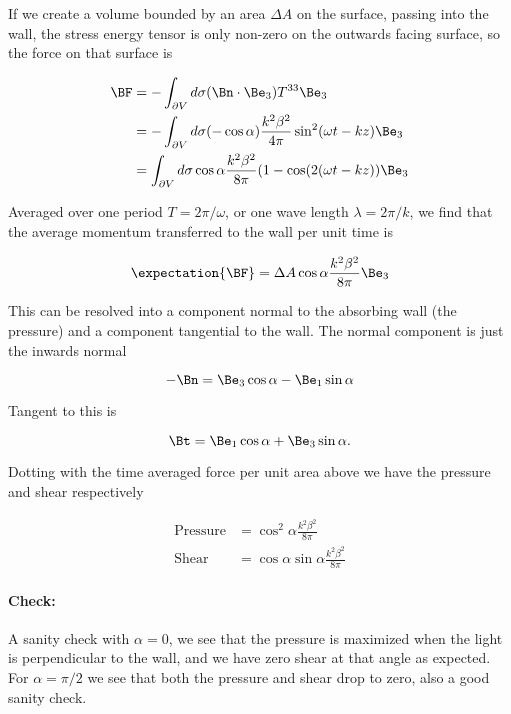 If we create a volume bounded by an area $\Delta A$ on the surface, passing into the wall, the stress energy tensor is only non-zero on the outwards facing surface, so the force on that surface is

\begin{align*}
\BF 
&= - \int_{\partial V} d\sigma (\Bn \cdot \Be_3) T^{3 3} \Be_3 \\
&= - \int_{\partial V} d\sigma (-\cos\alpha) \frac{k^2 \beta^2}{4 \pi} \sin^2(\omega t - k z) \Be_3 \\
&= \int_{\partial V} d\sigma \cos\alpha \frac{k^2 \beta^2}{8 \pi} (1 - \cos(2( \omega t - k z)) \Be_3 \\
\end{align*}

Averaged over one period $T = 2 \pi/\omega$, or one wave length $\lambda = 2 \pi/k$, we find that the average momentum transferred to the wall per unit time is

\begin{equation}\label{eqn:relativisticElectrodynamicsPS6P1:640}
\expectation{\BF} = \Delta A \cos\alpha \frac{k^2 \beta^2}{8 \pi} \Be_3 
\end{equation}

This can be resolved into a component normal to the absorbing wall (the pressure) and a component tangential to the wall.  The normal component is just the inwards normal

\begin{equation}\label{eqn:relativisticElectrodynamicsPS6P1:660}
-\Bn = \Be_3 \cos \alpha - \Be_1 \sin\alpha 
\end{equation}

Tangent to this is

\begin{equation}\label{eqn:relativisticElectrodynamicsPS6P1:680}
\Bt = \Be_1 \cos\alpha + \Be_3 \sin\alpha.
\end{equation}

Dotting with the time averaged force per unit area above we have the pressure and shear respectively

\begin{align}\label{eqn:relativisticElectrodynamicsPS6P1:700}
\text{Pressure} &= \cos^2\alpha \frac{k^2 \beta^2}{8 \pi} \\
\text{Shear} &= \cos\alpha \sin\alpha \frac{k^2 \beta^2}{8 \pi} 
\end{align}

\paragraph{Check:}

A sanity check with $\alpha = 0$, we see that the pressure is maximized when the light is perpendicular to the wall, and we have zero shear at that angle as expected.  For $\alpha = \pi/2$ we see that both the pressure and shear drop to zero, also a good sanity check.
